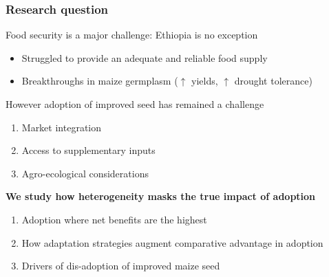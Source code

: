 \documentclass{beamer}
\begin{document}
\begin{frame}
\frametitle{Research question}

Food security is a major challenge: Ethiopia is no exception

\begin{itemize}
    \item Struggled to provide an adequate and reliable food supply
    \item Breakthroughs in maize germplasm ($\uparrow$ yields, $\uparrow$ drought tolerance)
\end{itemize}

However adoption of improved seed has remained a challenge

\begin{enumerate}
    \item Market integration
    \item Access to supplementary inputs
    \item Agro-ecological considerations
\end{enumerate}

\textbf{We study how heterogeneity masks the true impact of adoption}

\begin{enumerate}
    \item Adoption where  net benefits are the highest
    \item How adaptation strategies augment comparative advantage in adoption
    \item Drivers of dis-adoption of improved maize seed
\end{enumerate}



 
\end{frame}
\end{document}
